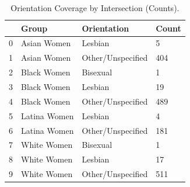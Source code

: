 \begin{table}[htbp]
\centering
\caption{Orientation Coverage by Intersection (Counts).}
\label{tab:eda_orientation_by_group}
\begin{tabular}{llll}
\toprule
 & Group & Orientation & Count \\
\midrule
0 & Asian Women & Lesbian & 5 \\
1 & Asian Women & Other/Unspecified & 404 \\
2 & Black Women & Bisexual & 1 \\
3 & Black Women & Lesbian & 19 \\
4 & Black Women & Other/Unspecified & 489 \\
5 & Latina Women & Lesbian & 4 \\
6 & Latina Women & Other/Unspecified & 181 \\
7 & White Women & Bisexual & 1 \\
8 & White Women & Lesbian & 17 \\
9 & White Women & Other/Unspecified & 511 \\
\bottomrule
\end{tabular}

\end{table}